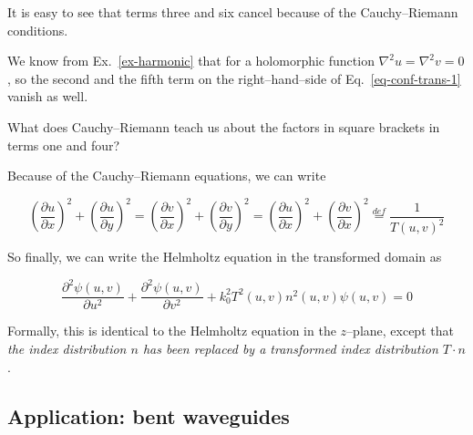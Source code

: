 It is easy to see that terms three and six cancel because of the Cauchy--Riemann conditions.

We know from Ex.~\ref{ex-harmonic} that for a holomorphic function $\nabla^2 u =
\nabla^2 v=0$, so the second and the fifth term on the right--hand--side of
Eq.~\ref{eq-conf-trans-1} vanish as well.

\begin{cue}
What does Cauchy--Riemann teach us about the factors in square brackets in terms one and four?
\end{cue}

Because of the Cauchy--Riemann equations, we can write

\begin{equation}
\left(\frac{\partial u}{\partial x}\right)^2 + \left(\frac{\partial u}{\partial
y}\right)^2 = \left(\frac{\partial v}{\partial x}\right)^2  +
\left(\frac{\partial v}{\partial y}\right)^2 = 
\left(\frac{\partial u}{\partial x}\right)^2 + \left(\frac{\partial v}{\partial
x}\right)^2 
 \stackrel{def}{=} \frac{1}{T(u,v)^2} \label{eq-T-factor}
\end{equation} 

So finally, we can write the Helmholtz equation in the transformed domain as

\begin{equation}
\frac{\partial^2 \psi(u,v)}{\partial u^2} + \frac{\partial^2 \psi(u,v)}{\partial
v^2} + k_0^2 T^2(u,v)n^2(u,v) \psi(u,v) = 0
\end{equation} 

Formally, this is identical to the Helmholtz equation in the $z$--plane, except that \emph{the index distribution $n$ has been replaced by a transformed index distribution $T \cdot n$}.

\subsection*{Application: bent waveguides}

